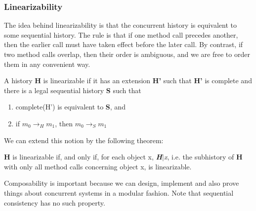 \documentclass[main]{subfiles}
\begin{document}

\subsubsection{Linearizability} \label{linearizable}
The idea behind linearizability is that the concurrent history is equivalent to some sequential history. The rule is that if one method call precedes another, then the earlier call must have taken effect before the later call. By contrast, if two method calls overlap,  then their order is ambiguous, and we are free to order them in any convenient way.
\begin{definition}
    A history \textbf{H} is linearizable if it has an extension \textbf{H'} such that \textbf{H'} is complete and there is a legal sequential history \textbf{S} such that
    \begin{enumerate}
        \item complete(H') is equivalent to \textbf{S}, and
        \item if $m_0 \rightarrow_H m_1$, then $m_0 \rightarrow_S m_1$
    \end{enumerate}
\end{definition}
We can extend this notion by the following theorem:
\begin{theorem}
    \textbf{H} is linearizable if, and only if, for each object x, \textit{\textbf{H}$\mid$x}, i.e. the subhistory of \textbf{H} with only all method calls concerning object x, is linearizable.
\end{theorem}
Composability is important because we can design, implement and also prove things about concurrent systems in a modular fashion. Note that sequential consistency has no such property.
\newpage

\end{document}
